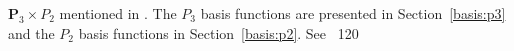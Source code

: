 
${\bm P}_3\times P_2$ mentioned in \cite{sten90}.
The $P_3$ basis functions are presented in Section~\ref{basis:p3} and the $P_2$ basis
functions in Section~\ref{basis:p2}.
See \stone~120
